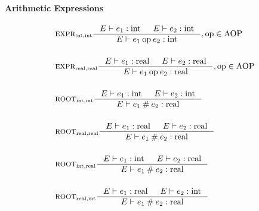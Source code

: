 \paragraph{Arithmetic Expressions}
\begin{align*}
&\inference[$\text{EXPR}_{\Tint,\Tint}$]{\Tenv e_1  : \Tint & 
                       \Tenv e_2 : \Tint}
                    {\Tenv e_1 \mathbin{\text{op}} e_2 : \Tint},  \text{op} \in \Taop
\\\\
&\inference[$\text{EXPR}_{\Treal,\Treal}$]{\Tenv e_1 : \Treal & 
                       \Tenv e_2 : \Treal}
                    {\Tenv e_1 \mathbin{\text{op}} e_2 : \Treal},  \text{op} \in \Taop
\\\\
&\inference[$\text{ROOT}_{\Tint,\Tint}$]{\Tenv e_1 : \Tint &
                       \Tenv e_2 : \Tint}
                    {\Tenv e_1 \mathbin{\#} e_2 : \Treal}
\\\\
&\inference[$\text{ROOT}_{\Treal,\Treal}$]{\Tenv e_1 : \Treal &
                       \Tenv e_2 : \Treal}
                    {\Tenv e_1 \mathbin{\#} e_2 : \Treal}
\\\\
&\inference[$\text{ROOT}_{\Tint,\Treal}$]{\Tenv e_1 : \Tint &
                       \Tenv e_2 : \Treal}
                    {\Tenv e_1 \mathbin{\#} e_2 : \Treal}
\\\\
&\inference[$\text{ROOT}_{\Treal,\Tint}$]{\Tenv e_1 : \Treal &
                       \Tenv e_2 : \Tint}
                    {\Tenv e_1 \mathbin{\#} e_2 : \Treal}
\end{align*}

